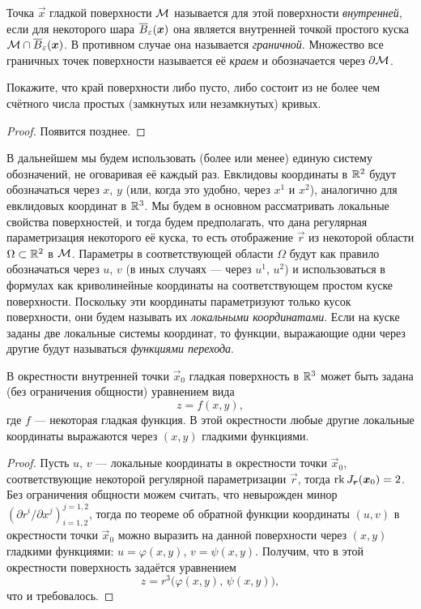 \begin{definition}
	Точка $\vec{x}$ гладкой поверхности $\mathcal{M}$ называется для этой поверхности \textit{внутренней}, если для некоторого шара $\overline{B}_\varepsilon(\boldsymbol{x})$ она является внутренней точкой простого куска $\mathcal{M} \cap \overline{B}_\varepsilon(\boldsymbol{x})$. В противном случае она называется \textit{граничной}. Множество все граничных точек поверхности называется её \textit{краем} и обозначается через $\partial\mathcal{M}$.
\end{definition}

\begin{proposition}
	Покажите, что край поверхности либо пусто, либо состоит из не более чем счётного числа простых (замкнутых или незамкнутых) кривых.
\end{proposition}

\begin{proof} %
	Появится позднее.
\end{proof}

В дальнейшем мы будем использовать (более или менее) единую систему обозначений, не оговаривая её каждый раз. Евклидовы координаты в $\mathbb{R}^2$ будут обозначаться через $x$, $y$ (или, когда это удобно, через $x^1$ и $x^2$), аналогично для евклидовых координат в $\mathbb{R}^3$. Мы будем в основном рассматривать локальные свойства поверхностей, и тогда будем предполагать, что дана регулярная параметризация некоторого её куска, то есть отображение $\vec{r}$ из некоторой области $\Omega \subset \mathbb{R}^2$ в $\mathcal{M}$. Параметры в соответствующей области $\Omega$ будут как правило обозначаться через $u$, $v$ (в иных случаях --- через $u^1$, $u^2$) и использоваться в формулах как криволинейные координаты на соответствующем простом куске поверхности. Поскольку эти координаты параметризуют только кусок поверхности, они будем называть их \textit{локальными координатами}. Если на куске заданы две локальные системы координат, то функции, выражающие одни через другие будут называться \textit{функциями перехода}.

\begin{proposition}
	В окрестности внутренней точки $\vec{x}_0$ гладкая поверхность в $\mathbb{R}^3$ может быть задана (без ограничения общности) уравнением вида
	\[
		z = f(x, y),
	\]
	где $f$ --- некоторая гладкая функция. В этой окрестности любые другие локальные координаты выражаются через $(x, y)$ гладкими функциями.
\end{proposition}

\begin{proof}
	Пусть $u$, $v$ --- локальные координаты в окрестности точки $\vec{x}_0$, соответствующие некоторой регулярной параметризации $\vec{r}$, тогда $\operatorname{rk} J_{\boldsymbol{r}}(\boldsymbol{x}_0) = 2$. Без ограничения общности можем считать, что невырожден минор $(\partial r^i / \partial x^j)_{i = 1, 2}^{j = 1, 2}$, тогда по теореме об обратной функции координаты $(u, v)$ в окрестности точки $\vec{x}_0$ можно выразить на данной поверхности через $(x, y)$ гладкими функциями: $u = \varphi(x, y)$, $v = \psi(x, y)$. Получим, что в этой окрестности поверхность задаётся уравнением
	\[
		z = r^3\big(\varphi(x, y),\,\psi(x, y)\big),
	\]
	что и требовалось.
\end{proof}

